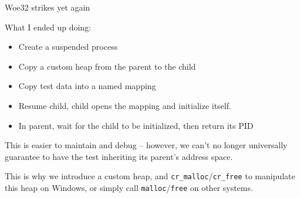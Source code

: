 \documentclass[10pt]{beamer}
\begin{document}
\begin{frame}[fragile]{Woe32 strikes yet again}

  What I ended up doing:

  \begin{itemize}
    \item Create a suspended process
    \item Copy a custom heap from the parent to the child
    \item Copy test data into a named mapping
    \item Resume child, child opens the mapping and initialize itself.
    \item In parent, wait for the child to be initialized, then return its PID
  \end{itemize}

  \pause{}

  This is easier to maintain and debug -- however, we can't no longer
  universally guarantee to have the test inheriting its parent's address space.

  \pause{}

  This is why we introduce a custom heap, and \verb|cr_malloc|/\verb|cr_free|
  to manipulate this heap on Windows, or simply call \verb|malloc|/\verb|free|
  on other systems.

\end{frame}
\end{document}
